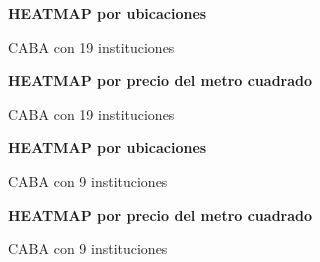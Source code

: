 \documentclass[a4paper, 10pt]{article}
\begin{document}
				\begin{figure}
    				\centering
    				\textbf{HEATMAP por ubicaciones}\par\medskip
    				\caption{CABA con 19 instituciones}
				\end{figure}				
				\begin{figure}
    				\centering
    				\textbf{HEATMAP por precio del metro cuadrado}\par\medskip
    				\caption{CABA con 19 instituciones}
				\end{figure}				
				\begin{figure}
    				\centering
    				\textbf{HEATMAP por ubicaciones}\par\medskip
    				\caption{CABA con 9 instituciones}
				\end{figure}				
				\begin{figure}
    				\centering
    				\textbf{HEATMAP por precio del metro cuadrado}\par\medskip
    				\caption{CABA con 9 instituciones}
				\end{figure}				
\end{document}
